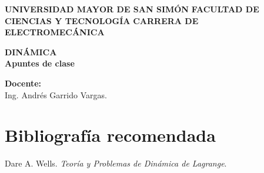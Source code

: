 \documentclass[letter,oneside,11pt]{book}
\begin{document}
\begin{titlepage}
    \begin{center}
        \begin{minipage}[]{.55\linewidth}
            \centering
            \large{\textbf{UNIVERSIDAD MAYOR DE SAN SIMÓN}} \newline
            \large{\textbf{FACULTAD DE CIENCIAS Y TECNOLOGÍA}} \newline
            \large{\textbf{CARRERA DE ELECTROMECÁNICA}} \newline
        \end{minipage}

        \vspace*{8.4cm}
        {\Large \textbf{DINÁMICA}}\\
        \vspace*{0.3cm}
        {\Large \textbf{Apuntes de clase}}\\
    \end{center}

    \vspace*{8.4cm}
    \leftskip=7.95cm
    \noindent
    \textbf{Docente:}\\
    Ing. Andrés Garrido Vargas.\\
\end{titlepage}

\clearpage
\setcounter{page}{1}

\tableofcontents
\newpage

\section*{Bibliografía recomendada}
\begin{enumerate}[{label=[\arabic{*}]}]
\item Dare A. Wells. \emph{Teoría y Problemas de Dinámica de \emph{Lagrange}}.
\end{enumerate}






%
%
\end{document}

